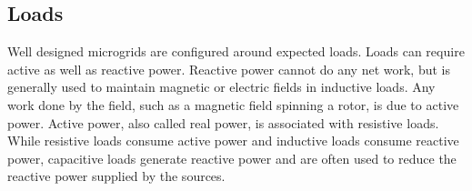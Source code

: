 

\subsection{Loads}
Well designed microgrids are configured around expected loads. Loads can require active as well as reactive power. Reactive power cannot do any net work, but is generally used to maintain magnetic or electric fields in inductive loads. Any work done by the field, such as a magnetic field spinning a rotor, is due to active power. Active power, also called real power, is associated with resistive loads. While resistive loads consume active power and inductive loads consume reactive power, capacitive loads generate reactive power and are often used to reduce the reactive power supplied by the sources. 


